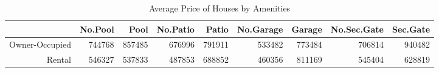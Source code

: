 \begin{table}[ht]
\centering
\begin{tabular}{rrrrrrrrr}
  \hline
 & No.Pool & Pool & No.Patio & Patio & No.Garage & Garage & No.Sec.Gate & Sec.Gate \\ 
  \hline
Owner-Occupied & 744768 & 857485 & 676996 & 791911 & 533482 & 773484 & 706814 & 940482 \\ 
  Rental & 546327 & 537833 & 487853 & 688852 & 460356 & 811169 & 545404 & 628819 \\ 
   \hline
\end{tabular}
\caption{Average Price of Houses by Amenities} 
\label{tab:avg_price_by_amen}
\end{table}
